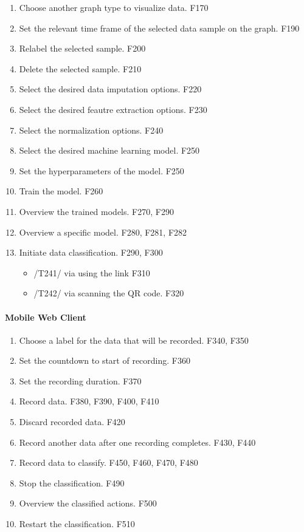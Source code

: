 \begin{enumerate}[{label = \textbf{/T{\protect\twodigits{\arabic{enumi}}}0/}, leftmargin = *}]
    \item Choose another graph type to visualize data. F170
    \item Set the relevant time frame of the selected data sample on the graph. F190
    \item Relabel the selected sample. F200
    \item Delete the selected sample. F210
    \item Select the desired data imputation options. F220
    \item Select the desired feautre extraction options. F230
    \item Select the normalization options. F240
    \item Select the desired machine learning model. F250
    \item Set the hyperparameters of the model. F250
    \item Train the model. F260
    \item Overview the trained models. F270, F290
    \item Overview a specific model. F280, F281, F282
    \item Initiate data classification. F290, F300
    \begin{itemize}
        \item /T241/ via using the link F310
        \item /T242/ via scanning the QR code. F320
    \end{itemize} 
\end{enumerate}

\paragraph{Mobile Web Client}
\begin{enumerate}[resume*]
    \item Choose a label for the data that will be recorded. F340, F350
    \item Set the countdown to start of recording. F360
    \item Set the recording duration. F370
    \item Record data. F380, F390, F400, F410
    \item Discard recorded data. F420
    \item Record another data after one recording completes. F430, F440
    \item Record data to classify. F450, F460, F470, F480
    \item Stop the classification. F490
    \item Overview the classified actions. F500
    \item Restart the classification. F510
\end{enumerate}

